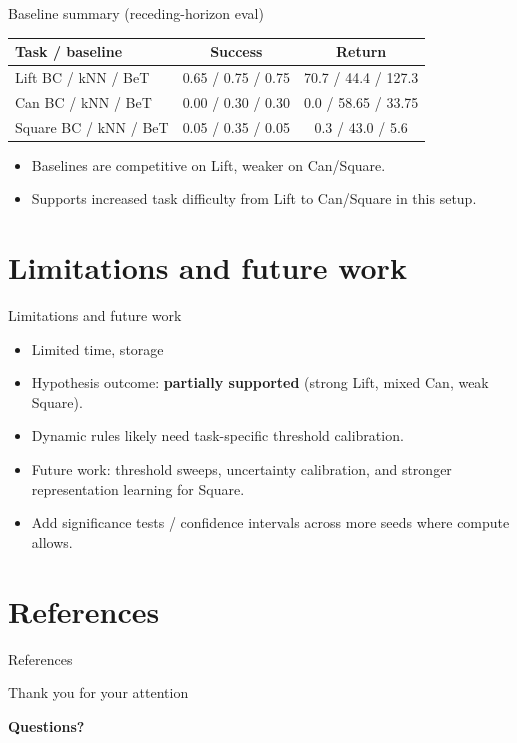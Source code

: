 \documentclass[aspectratio=169]{beamer}
\begin{document}
\begin{frame}{Baseline summary (receding-horizon eval)}
\footnotesize
\begin{tabular}{@{}lcc@{}}
\toprule
Task / baseline & Success & Return \\
\midrule
Lift BC / kNN / BeT & 0.65 / 0.75 / 0.75 & 70.7 / 44.4 / 127.3 \\
Can BC / kNN / BeT & 0.00 / 0.30 / 0.30 & 0.0 / 58.65 / 33.75 \\
Square BC / kNN / BeT & 0.05 / 0.35 / 0.05 & 0.3 / 43.0 / 5.6 \\
\bottomrule
\end{tabular}
\vspace{0.5em}
\begin{itemize}
    \item Baselines are competitive on Lift, weaker on Can/Square.
    \item Supports increased task difficulty from Lift to Can/Square in this setup.
\end{itemize}
\end{frame}

\section{Limitations and future work}
\begin{frame}{Limitations and future work}
    \begin{itemize}
        \item Limited time, storage
        \item Hypothesis outcome: \textbf{partially supported} (strong Lift, mixed Can, weak Square).
        \item Dynamic rules likely need task-specific threshold calibration.
        \item Future work: threshold sweeps, uncertainty calibration, and stronger representation learning for Square.
        \item Add significance tests / confidence intervals across more seeds where compute allows.
    \end{itemize}
\end{frame}

\section{References}
\begin{frame}[allowframebreaks]{References}
\tiny
\nocite{*}


\end{frame}

{
\begin{frame}[c]
    \centering
    {\Huge \textcolor{UofTBlue}{Thank you for your attention}}

    \vspace{1.5cm}
    \normalsize
    \textbf{Questions?}
\end{frame}
}
\end{document}
